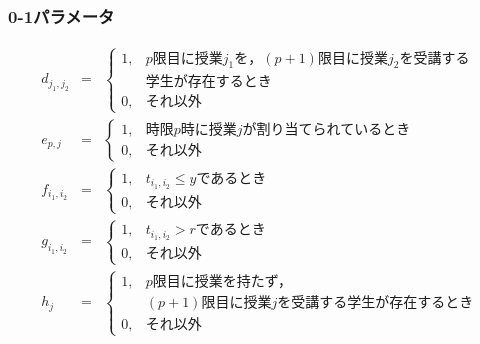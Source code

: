 \documentclass[dvipdfmx,12pt]{beamer}
\begin{document}
\begin{frame}
\frametitle {\Large 0-1パラメータ}
\small{
\[
\begin{array}{rcl}
  d_{j_1,j_2} & = & \left\{ 
\begin{array}{ll}
	1, & \mbox{$p$限目に授業$j_1$を，$(p+1)$限目に授業$j_2$を受講する}\\
		& \mbox{学生が存在するとき} 		\\
	0, & \mbox{それ以外}
\end{array}
\right. \\


  e_{p,j} & = & \left\{ 
\begin{array}{ll}
	1, & \mbox{時限$p$時に授業$j$が割り当てられているとき} 		\\
	0, & \mbox{それ以外}
\end{array}
\right. \\



f_{i_1,i_2} & = & \left\{ 
\begin{array}{ll}
1, & \mbox{$t_{i_1,i_2}\leq y$であるとき} \\
0, & \mbox{それ以外}
\end{array}
\right.\\


g_{i_1,i_2} & = & \left\{ 
\begin{array}{ll}
1, & \mbox{$t_{i_1,i_2}>r$であるとき} \\
0, & \mbox{それ以外}
\end{array}
\right.\\

h_{j} & = & \left\{ 
\begin{array}{ll}
1, & \mbox{$p$限目に授業を持たず，}\\
	& \mbox{$(p+1)$限目に授業$j$を受講する学生が存在するとき} \\
0, & \mbox{それ以外}
\end{array}
\right.\\
\end{array}
\]
}
\end{frame}
\end{document}
